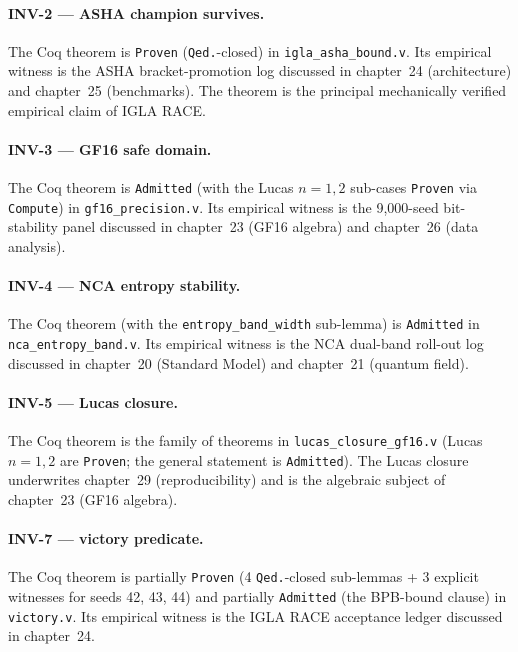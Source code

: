 \paragraph{INV-2 — ASHA champion survives.}
The Coq theorem  is \texttt{Proven}
(\texttt{Qed.}-closed) in \texttt{igla\_asha\_bound.v}. Its empirical witness
is the ASHA bracket-promotion log discussed in chapter~24 (architecture) and
chapter~25 (benchmarks). The theorem is the principal mechanically verified
empirical claim of IGLA RACE.

\paragraph{INV-3 — GF16 safe domain.}
The Coq theorem  is \texttt{Admitted} (with
the Lucas $n=1,2$ sub-cases \texttt{Proven} via \texttt{Compute}) in
\texttt{gf16\_precision.v}. Its empirical witness is the
9{,}000-seed bit-stability panel discussed in chapter~23 (GF16 algebra) and
chapter~26 (data analysis).

\paragraph{INV-4 — NCA entropy stability.}
The Coq theorem  (with the
\texttt{entropy\_band\_width} sub-lemma) is \texttt{Admitted} in
\texttt{nca\_entropy\_band.v}. Its empirical witness is the NCA dual-band
roll-out log discussed in chapter~20 (Standard Model) and chapter~21
(quantum field).

\paragraph{INV-5 — Lucas closure.}
The Coq theorem  is the family of theorems
in \texttt{lucas\_closure\_gf16.v} (Lucas $n=1,2$ are \texttt{Proven}; the
general statement is \texttt{Admitted}). The Lucas closure underwrites
chapter~29 (reproducibility) and is the algebraic subject of chapter~23
(GF16 algebra).

\paragraph{INV-7 — victory predicate.}
The Coq theorem  is partially
\texttt{Proven} (4 \texttt{Qed.}-closed sub-lemmas + 3 explicit witnesses for
seeds 42, 43, 44) and partially \texttt{Admitted} (the BPB-bound clause) in
\texttt{victory.v}. Its empirical witness is the IGLA RACE acceptance ledger
discussed in chapter~24.

